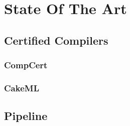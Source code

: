
%

\chapter{State Of The Art}
\label{cha:State_Of_The_Art}

\section{Certified Compilers}
\label{sec:Certified_Compilers}

\subsection{CompCert}
\label{sec:CompCert}

\subsection{CakeML}
\label{sec:CakeML}

\section{Pipeline}
\label{sec:Pipeline}